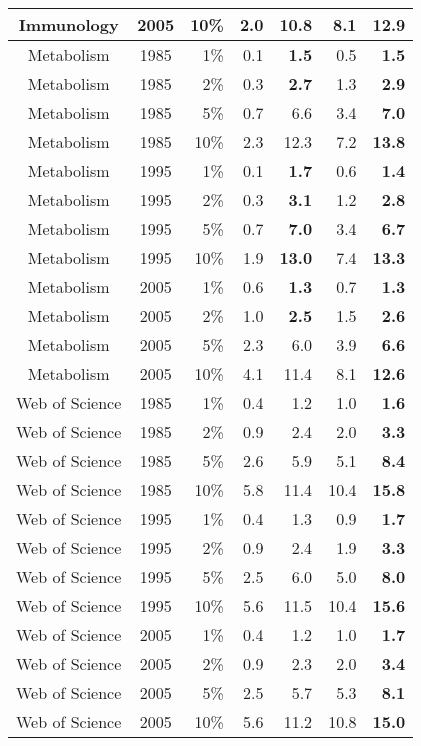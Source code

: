 \documentclass[11pt, oneside]{article}   	%
\begin{document}
\begin{itemize}
\begin{enumerate}
\begin{table}
\begin{centering}
{\begin{tabular}{|c crrrr r|}
Immunology & 2005&10\%& 2.0& 10.8& 8.1& \bf{12.9} \\ 
\hline
Metabolism & 1985&1\%& 0.1& \bf{1.5}& 0.5& \bf{1.5} \\ 
Metabolism & 1985&2\%& 0.3& \bf{2.7}& 1.3& \bf{2.9} \\ 
Metabolism & 1985&5\%& 0.7& 6.6& 3.4& \bf{7.0} \\ 
Metabolism & 1985&10\%& 2.3& 12.3& 7.2& \bf{13.8} \\ 
Metabolism & 1995&1\%& 0.1& \bf{1.7}& 0.6& \bf{1.4} \\ 
Metabolism & 1995&2\%& 0.3& \bf{3.1}& 1.2& \bf{2.8} \\ 
Metabolism & 1995&5\%& 0.7& \bf{7.}0& 3.4& \bf{6.7} \\ 
Metabolism & 1995&10\%& 1.9& \bf{13.0}& 7.4& \bf{13.3} \\ 
Metabolism & 2005&1\%& 0.6& \bf{1.3}& 0.7& \bf{1.3} \\ 
Metabolism & 2005&2\%& 1.0& \bf{2.5}& 1.5& \bf{2.6} \\ 
Metabolism & 2005&5\%& 2.3& 6.0& 3.9& \bf{6.6} \\ 
Metabolism & 2005&10\%& 4.1& 11.4& 8.1& \bf{12.6} \\ 
\hline
Web of Science & 1985&1\%& 0.4& 1.2& 1.0& \bf{1.6} \\ 
Web of Science & 1985&2\%& 0.9& 2.4& 2.0& \bf{3.3} \\ 
Web of Science & 1985&5\%& 2.6& 5.9& 5.1& \bf{8.4} \\ 
Web of Science & 1985&10\%& 5.8& 11.4& 10.4& \bf{15.8} \\ 
Web of Science & 1995&1\%& 0.4& 1.3& 0.9& \bf{1.7} \\ 
Web of Science & 1995&2\%& 0.9& 2.4& 1.9& \bf{3.3} \\ 
Web of Science & 1995&5\%& 2.5& 6.0& 5.0& \bf{8.0} \\ 
Web of Science & 1995&10\%& 5.6& 11.5& 10.4& \bf{15.6} \\ 
Web of Science & 2005&1\%& 0.4& 1.2& 1.0& \bf{1.7} \\ 
Web of Science & 2005&2\%& 0.9& 2.3& 2.0& \bf{3.4} \\ 
Web of Science & 2005&5\%& 2.5& 5.7& 5.3& \bf{8.1} \\ 
Web of Science & 2005&10\%& 5.6& 11.2& 10.8& \bf{15.0} \\
\hline

\end{tabular}}
\end{centering}
\end{table}
\end{enumerate}
\end{itemize}
\end{document}
